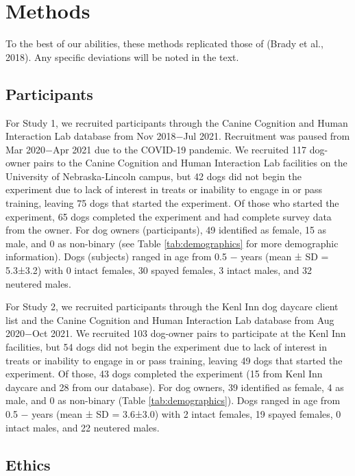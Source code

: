 \documentclass[
  pub,floatsintext]{apa6}
\begin{document}
\hypertarget{methods}{%
\section{Methods}\label{methods}}

To the best of our abilities, these methods replicated those of (Brady et al., 2018). Any specific deviations will be noted in the text.

\hypertarget{participants}{%
\subsection{Participants}\label{participants}}

For Study 1, we recruited participants through the Canine Cognition and Human Interaction Lab database from Nov 2018\(-\)Jul 2021. Recruitment was paused from Mar 2020\(-\)Apr 2021 due to the COVID-19 pandemic. We recruited 117 dog-owner pairs to the Canine Cognition and Human Interaction Lab facilities on the University of Nebraska-Lincoln campus, but 42 dogs did not begin the experiment due to lack of interest in treats or inability to engage in or pass training, leaving 75 dogs that started the experiment. Of those who started the experiment, 65 dogs completed the experiment and had complete survey data from the owner. For dog owners (participants), 49 identified as female, 15 as male, and 0 as non-binary (see Table \ref{tab:demographics} for more demographic information). Dogs (subjects) ranged in age from 0.5 \negthickspace \(-\)  years (mean ± SD = 5.3±3.2) with 0 intact females, 30 spayed females, 3 intact males, and 32 neutered males.

For Study 2, we recruited participants through the Kenl Inn dog daycare client list and the Canine Cognition and Human Interaction Lab database from Aug 2020\(-\)Oct 2021. We recruited 103 dog-owner pairs to participate at the Kenl Inn facilities, but 54 dogs did not begin the experiment due to lack of interest in treats or inability to engage in or pass training, leaving 49 dogs that started the experiment. Of those, 43 dogs completed the experiment (15 from Kenl Inn daycare and 28 from our database). For dog owners, 39 identified as female, 4 as male, and 0 as non-binary (Table \ref{tab:demographics}). Dogs ranged in age from 0.5 \negthickspace \(-\)  years (mean ± SD = 3.6±3.0) with 2 intact females, 19 spayed females, 0 intact males, and 22 neutered males.

\hypertarget{ethics}{%
\subsection{Ethics}\label{ethics}}
\end{document}
